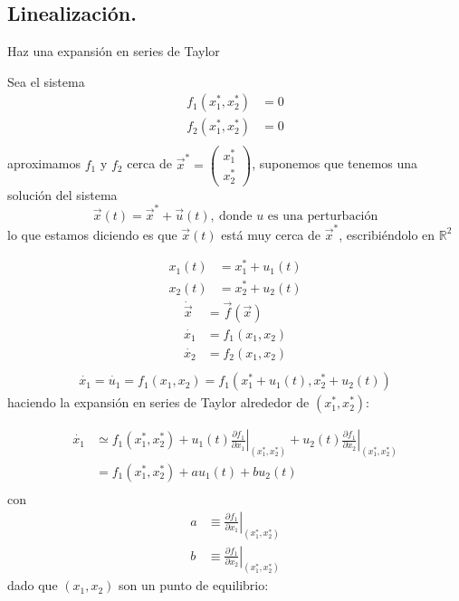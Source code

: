 \subsection{Linealización.}

\begin{tcolorbox}[colback=Black!4,colframe=White] 
\begin{nota}
  Haz una expansión en series de Taylor
\end{nota}
\end{tcolorbox}
Sea el sistema
$$
\begin{aligned}
  f_1(x_1^*,x_2^*) &= 0 \\
  f_2(x_1^*,x_2^*) &= 0 \\ 
\end{aligned}
$$
aproximamos $f_1$ y $f_2$ cerca de $\vec{x}^*=\begin{pmatrix} x_1^* \\ x_2^* \end{pmatrix} $, suponemos que tenemos una solución del sistema $$
\vec{x}(t)=\vec{x}^*+\vec{u}(t) ,\ \text{donde $u$ es una perturbación}
$$
lo que estamos diciendo es que $\vec{x}(t)$ está muy cerca de $\vec{x}^*$, escribiéndolo en $\mathbb{R}^2$

$$
\begin{aligned}
  x_1(t) &= x_1^*+u_1(t) \\ 
  x_2(t) &= x_2^* + u_2(t) 
\end{aligned}
$$
$$
\begin{aligned}
  \dot{\vec{x}} &= \vec{f}(\vec{x}) \\ 
  \dot{x_1} &= f_1(x_1,x_2) \\
  \dot{x_2} &= f_2(x_1,x_2) \\ 
\end{aligned}
$$
$$
\begin{aligned}
  \dot{x_1}=\dot{u_1}=f_1(x_1,x_2) = f_1(x_1^*+u_1(t), x_2^*+u_2(t)) 
\end{aligned}
$$
haciendo la expansión en series de Taylor alrededor de $(x_1^*,x_2^*)$:

$$
 \begin{aligned}
  \dot{x_1} &\simeq f_1(x_1^*,x_2^*)+u_1(t)\left. \frac{\partial f_1}{\partial x_1} \right|_{(x_1^*,x_2^*)} + u_2(t)\left. \frac{\partial f_1}{\partial x_2} \right|_{(x_1^*,x_2^*)} \\
      &= f_1(x_1^*,x_2^*) + au_1(t)+bu_2(t) \\ 
\end{aligned}
$$
con $$
\begin{aligned}
  a &\equiv \left. \frac{\partial f_1}{\partial x_1} \right|_{(x_1^*,x_2^*)} \\
    b&\equiv \left. \frac{\partial f_1}{\partial x_2} \right|_{(x_1^*,x_2^*)}
\end{aligned}
$$
dado que $(x_1,x_2)$ son un punto de equilibrio:

